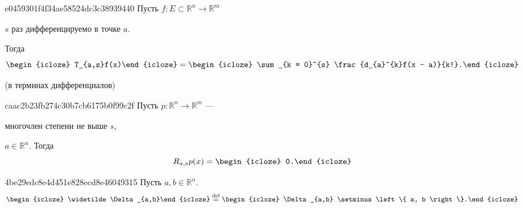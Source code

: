 \begin{note}{e0459301f4f34ae58524dc3c38939440}
    Пусть \({ f : E \subset \mathbb R^{n} \to \mathbb R^{m} }\) \begin{icloze}{3}\({ s }\) раз дифференцируемо в точке \({ a }\).\end{icloze}
    Тогда
    \[
        \begin{icloze}{2}T_{a,s}f(x)\end{icloze} = \begin{icloze}{1}\sum_{k = 0}^{s} \frac{d_{a}^{k}f(x - a)}{k!}.\end{icloze}
    \]

    \begin{center}
        \tiny
        (в терминах дифференциалов)
    \end{center}
\end{note}

\begin{note}{caac2b23fb274c30b7cb6175b0f99c2f}
    Пусть \({ p : \mathbb R^{n} \to \mathbb R^{m} }\) --- \begin{icloze}{2}многочлен степени не выше \({ s }\),\end{icloze} \({ a \in \mathbb R^{n} }\).
    Тогда
    \[
        R_{a,s}p(x) = \begin{icloze}{1}0.\end{icloze}
    \]
\end{note}

\begin{note}{4be29edc8e4d451e828ecd8e46049315}
    Пусть \({ a, b \in \mathbb R^{n} }\).
    \[
        \begin{icloze}{2}\widetilde\Delta_{a,b}\end{icloze} \overset{\text{def}}= \begin{icloze}{1}\Delta_{a,b} \setminus \left\{ a, b \right\}.\end{icloze}
    \]
\end{note}

